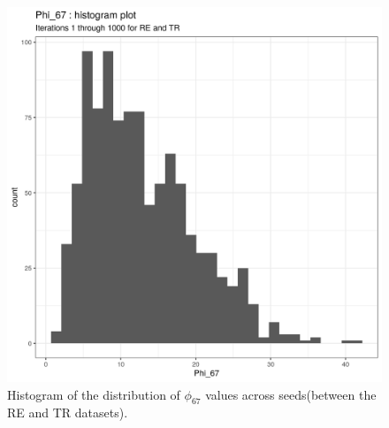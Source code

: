 \documentclass[12pt]{article} %
\begin{document}
	
	
	
	\begin{figure}[h]
		\centering
		\includegraphics[scale=0.75]{Images/Biology_data/Set_1000/All_datasets/Phi_histograms/Phi_67_histogram_plot.png}
		\caption{Histogram of the distribution of $\phi_{67}$ values across seeds(between the RE and TR datasets).}
		\label{fig:results:cedar_2:mdi_re_tr_phi_histogram}
	\end{figure}
	
	
\end{document}
